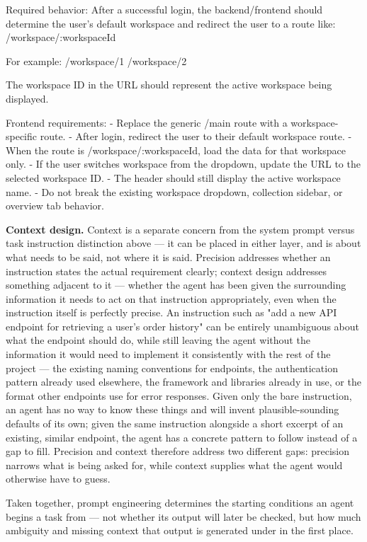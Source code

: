 \begin{listing}[H]
\begin{center}
\begin{promptbox}
Required behavior: After a successful login, the backend/frontend should determine the user's default workspace and redirect the user to a route like:
/workspace/:workspaceId

For example:
/workspace/1
/workspace/2

The workspace ID in the URL should represent the active workspace being displayed.

Frontend requirements:
- Replace the generic /main route with a workspace-specific route.
- After login, redirect the user to their default workspace route.
- When the route is /workspace/:workspaceId, load the data for that workspace only.
- If the user switches workspace from the dropdown, update the URL to the selected workspace ID.
- The header should still display the active workspace name.
- Do not break the existing workspace dropdown, collection sidebar, or overview tab behavior.
\end{promptbox}
\end{center}
\caption{Excerpt of a precisely specified prompt for the workspace-scoped routing feature, from Part 1 of this thesis's practical project.}
\label{lst:workspace-routing-prompt}
\end{listing}

\textbf{Context design.} Context is a separate concern from the system prompt versus task instruction distinction above --- it can be placed in either layer, and is about what needs to be said, not where it is said. Precision addresses whether an instruction states the actual requirement clearly; context design addresses something adjacent to it --- whether the agent has been given the surrounding information it needs to act on that instruction appropriately, even when the instruction itself is perfectly precise. An instruction such as "add a new API endpoint for retrieving a user's order history" can be entirely unambiguous about what the endpoint should do, while still leaving the agent without the information it would need to implement it consistently with the rest of the project --- the existing naming conventions for endpoints, the authentication pattern already used elsewhere, the framework and libraries already in use, or the format other endpoints use for error responses. Given only the bare instruction, an agent has no way to know these things and will invent plausible-sounding defaults of its own; given the same instruction alongside a short excerpt of an existing, similar endpoint, the agent has a concrete pattern to follow instead of a gap to fill. Precision and context therefore address two different gaps: precision narrows what is being asked for, while context supplies what the agent would otherwise have to guess.

Taken together, prompt engineering determines the starting conditions an agent begins a task from --- not whether its output will later be checked, but how much ambiguity and missing context that output is generated under in the first place.

